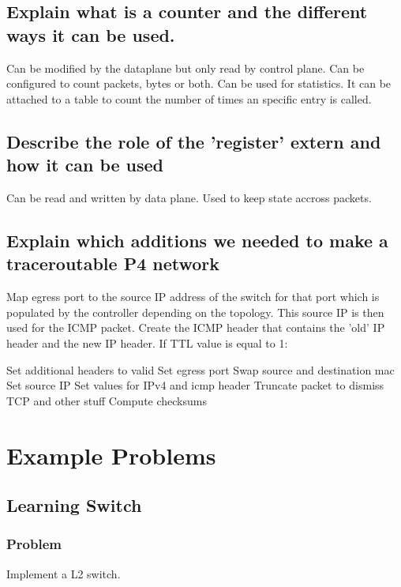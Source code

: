 \documentclass[a4paper, fontsize=8pt, landscape, DIV=1]{scrartcl}
\begin{document}
\begin{multicols*}{4}
  \subsection{Explain what is a counter and the different ways it can be used.}
  Can be modified by the dataplane but only read by control plane. Can be configured to
  count packets, bytes or both. Can be used for statistics.
  It can be attached to a table to count the number of times an specific entry is called.

  \subsection{Describe the role of the 'register' extern and how it can be used}
  Can be read and written by data plane. Used to keep state accross packets.

  \subsection{Explain which additions we needed to make a traceroutable P4 network}
  Map egress port to the source IP address of the switch for that port which is populated 
  by the controller depending on the topology. This source IP is then used for the ICMP
  packet. Create the ICMP header that contains the 'old' IP header and the new IP header.
  If TTL value is equal to 1:
  \begin{outline}
  \1 Set additional headers to valid
  \1 Set egress port
  \1 Swap source and destination mac
  \1 Set source IP
  \1 Set values for IPv4 and icmp header
  \1 Truncate packet to dismiss TCP and other stuff
  \1 Compute checksums
  \end{outline}


  \section{Example Problems}
  \subsection{Learning Switch}
  \subsubsection{Problem}
  Implement a L2 switch. 


\end{multicols*}
\end{document}
